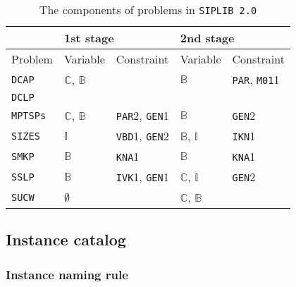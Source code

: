 \begin{table}[H]
	\centering
	\caption{The components of problems in \texttt{SIPLIB 2.0}}
	\label{table:prob_class}
	\begin{tabular}{@{}lllll@{}}
		\toprule
		& \multicolumn{2}{l}{1st stage}                              				  & \multicolumn{2}{l}{2nd stage}                             			      \\ \midrule
		Problem 	     & Variable                    & Constraint                   & Variable                    & Constraint                  \\ \midrule
		\texttt{DCAP}    & $\mathbb{C}$, $\mathbb{B}$ &                              & $\mathbb{B}$                & \texttt{PAR}, \texttt{M01}1 \\
		\texttt{DCLP}	 &							&								&							&								\\				
		\texttt{MPTSPs}  & $\mathbb{C}$, $\mathbb{B}$ & \texttt{PAR}2, \texttt{GEN}1 & $\mathbb{B}$                & \texttt{GEN}2               \\
		\texttt{SIZES}   & $\mathbb{I}$ 			   & \texttt{VBD}1, \texttt{GEN}2 & $\mathbb{B}$, $\mathbb{I}$  & \texttt{IKN}1               \\
		\texttt{SMKP}    & $\mathbb{B}$                & \texttt{KNA}1                & $\mathbb{B}$                & \texttt{KNA}1               \\
		\texttt{SSLP}    & $\mathbb{B}$               & \texttt{IVK}1, \texttt{GEN}1 & $\mathbb{C}$, $\mathbb{I}$ & \texttt{GEN}2               \\
		\texttt{SUCW}    & $\emptyset$                &                              & $\mathbb{C}$, $\mathbb{B}$  &                             \\ \bottomrule
	\end{tabular}

\end{table}

\subsection{Instance catalog}

\subsubsection{Instance naming rule}

